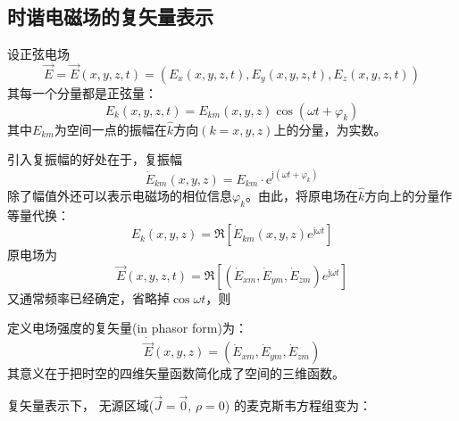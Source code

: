     \subsection{时谐电磁场的复矢量表示}
    {\color{gray}设正弦电场
    \begin{equation}
        \vec{E}=\vec{E}\left(x,y,z,t\right)=\left(E_x\left(x,y,z,t\right),E_y\left(x,y,z,t\right),E_z\left(x,y,z,t\right)\right)
    \end{equation}
    其每一个分量都是正弦量：
    \begin{equation}
        E_k\left(x,y,z,t\right)=E_{km}\left(x,y,z\right)\cos{\left(\omega t+\varphi_k\right)}
    \end{equation}
    其中$E_{km}$为空间一点的振幅在$\hat{k}$方向$(k=x,y,z)$上的分量，为实数。
    
    
    引入复振幅的好处在于，复振幅
    \begin{equation*}
        \dot{E}_{km}\left(x,y,z\right)=E_{km}\cdot \mathrm{e}^{\mathrm{j}(\omega t+\varphi_k)}
    \end{equation*}
    除了幅值外还可以表示电磁场的相位信息$\varphi_k$。由此，将原电场在$\hat{k}$方向上的分量作等量代换：
    \begin{equation}
        E_k\left(x,y,z\right)=\Re\left[{\dot{E}}_{km}\left(x,y,z\right)e^{\mathrm{j}\omega t}\right]
    \end{equation}
    原电场为
    \begin{equation}
        \vec{E}\left(x,y,z,t\right)=\Re\left[\left({\dot{E}}_{xm},{\dot{E}}_{ym},{\dot{E}}_{zm}\right)e^{\mathrm{j}\omega t}\right]
    \end{equation}
    又通常频率已经确定，省略掉$\cos{\omega t}$，则}定义电场强度的复矢量(in phasor form)为：
    \begin{equation}
        \dot{\vec{E}}(x,y,z)=\left({\dot{E}}_{xm},{\dot{E}}_{ym},{\dot{E}}_{zm}\right)
    \end{equation}
        其意义在于把时空的四维矢量函数简化成了空间的三维函数。


    复矢量表示下， 无源区域($\vec{J}=\vec{0},\,\rho=0$)  的麦克斯韦方程组变为：
    
